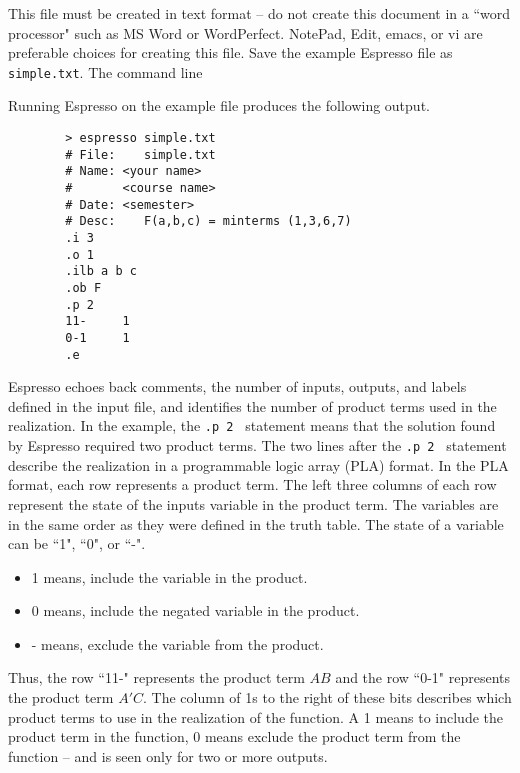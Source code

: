 This file must be created in text format -- do not create this document
in a ``word processor" such as MS Word or WordPerfect.  NotePad, Edit,
emacs, or vi are preferable choices for creating this file.  Save
the example Espresso file as \verb+simple.txt+.  The command
line

Running
Espresso on the example file produces the following output.

\begin{verbatim}
        > espresso simple.txt
        # File:    simple.txt
        # Name: <your name>
        #       <course name>
        # Date: <semester>
        # Desc:    F(a,b,c) = minterms (1,3,6,7)
        .i 3
        .o 1
        .ilb a b c
        .ob F
        .p 2
        11-     1
        0-1     1
        .e
\end{verbatim}

Espresso echoes back comments, the number of inputs, outputs,
and labels defined in the input file,  and identifies the number of product
terms used in the realization.  In the example, the
\verb+.p 2 + statement means that the solution found by Espresso
required two product terms.  The two lines after the \verb+.p 2 +
statement describe the realization in a programmable logic
array (PLA) format.  In the PLA format, each row represents a
product term.  The left three columns of each row represent the
state of the inputs variable in the product term.  The variables
are in the same order as they were defined in the truth table.
The state of a variable can be ``1", ``0", or ``-".
\begin{itemize}
\item 1 means, include the variable in the product.
\item 0 means, include the negated variable in the product.
\item - means, exclude the variable from the product.
\end{itemize}

Thus, the row ``11-" represents the product term $AB$ and the row ``0-1"
represents the product term $A'C$.  The column of 1s to the right
of these bits describes which product terms to use in the realization
of the function.  A 1 means to include the product term in the
function, 0 means exclude the product term from the function --
and is seen only for two or more outputs.

